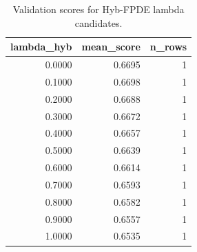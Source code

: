 \begin{table}[t]
\caption{Validation scores for Hyb-FPDE lambda candidates.}
\label{tab:lambda_distribution_computed}
\centering
\begin{tabular}{rrr}
\toprule
lambda\_hyb & mean\_score & n\_rows \\
\midrule
0.0000 & 0.6695 & 1 \\
0.1000 & 0.6698 & 1 \\
0.2000 & 0.6688 & 1 \\
0.3000 & 0.6672 & 1 \\
0.4000 & 0.6657 & 1 \\
0.5000 & 0.6639 & 1 \\
0.6000 & 0.6614 & 1 \\
0.7000 & 0.6593 & 1 \\
0.8000 & 0.6582 & 1 \\
0.9000 & 0.6557 & 1 \\
1.0000 & 0.6535 & 1 \\
\bottomrule
\end{tabular}

\end{table}
